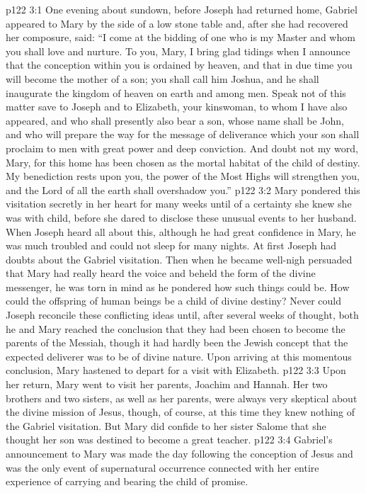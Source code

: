 \vs p122 3:1 One evening about sundown, before Joseph had returned home, Gabriel appeared to Mary by the side of a low stone table and, after she had recovered her composure, said: “I come at the bidding of one who is my Master and whom you shall love and nurture. To you, Mary, I bring glad tidings when I announce that the conception within you is ordained by heaven, and that in due time you will become the mother of a son; you shall call him Joshua, and he shall inaugurate the kingdom of heaven on earth and among men. Speak not of this matter save to Joseph and to Elizabeth, your kinswoman, to whom I have also appeared, and who shall presently also bear a son, whose name shall be John, and who will prepare the way for the message of deliverance which your son shall proclaim to men with great power and deep conviction. And doubt not my word, Mary, for this home has been chosen as the mortal habitat of the child of destiny. My benediction rests upon you, the power of the Most Highs will strengthen you, and the Lord of all the earth shall overshadow you.”
\vs p122 3:2 \pc Mary pondered this visitation secretly in her heart for many weeks until of a certainty she knew she was with child, before she dared to disclose these unusual events to her husband. When Joseph heard all about this, although he had great confidence in Mary, he was much troubled and could not sleep for many nights. At first Joseph had doubts about the Gabriel visitation. Then when he became well\hyp{}nigh persuaded that Mary had really heard the voice and beheld the form of the divine messenger, he was torn in mind as he pondered how such things could be. How could the offspring of human beings be a child of divine destiny? Never could Joseph reconcile these conflicting ideas until, after several weeks of thought, both he and Mary reached the conclusion that they had been chosen to become the parents of the Messiah, though it had hardly been the Jewish concept that the expected deliverer was to be of divine nature. Upon arriving at this momentous conclusion, Mary hastened to depart for a visit with Elizabeth.
\vs p122 3:3 Upon her return, Mary went to visit her parents, Joachim and Hannah. Her two brothers and two sisters, as well as her parents, were always very skeptical about the divine mission of Jesus, though, of course, at this time they knew nothing of the Gabriel visitation. But Mary did confide to her sister Salome that she thought her son was destined to become a great teacher.
\vs p122 3:4 \pc Gabriel’s announcement to Mary was made the day following the conception of Jesus and was the only event of supernatural occurrence connected with her entire experience of carrying and bearing the child of promise.
